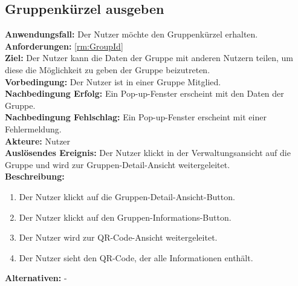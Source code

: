 \documentclass[parskip=full]{scrartcl}
\begin{document}
\subsection{Gruppenkürzel ausgeben}
\textbf{Anwendungsfall:} Der Nutzer möchte den Gruppenkürzel erhalten.\\
\textbf{Anforderungen:} \ref{rm:GroupId}\\
\textbf{Ziel:} Der Nutzer kann die Daten der Gruppe mit anderen Nutzern teilen, um diese die Möglichkeit zu geben der Gruppe beizutreten.\\
\textbf{Vorbedingung:} Der Nutzer ist in einer Gruppe Mitglied.\\
\textbf{Nachbedingung Erfolg:} Ein Pop-up-Fenster erscheint mit den Daten der Gruppe.\\
\textbf{Nachbedingung Fehlschlag:} Ein Pop-up-Fenster erscheint mit einer Fehlermeldung.\\
\textbf{Akteure:} Nutzer \\
\textbf{Auslösendes Ereignis:} Der Nutzer klickt in der Verwaltungsansicht auf die Gruppe und wird zur Gruppen-Detail-Ansicht weitergeleitet.\\
\textbf{Beschreibung:}
\begin{enumerate}
    \item Der Nutzer klickt auf die Gruppen-Detail-Ansicht-Button.
    \item Der Nutzer klickt auf den Gruppen-Informations-Button.
    \item Der Nutzer wird zur QR-Code-Ansicht weitergeleitet.
    \item Der Nutzer sieht den QR-Code, der alle Informationen enthält.
\end{enumerate}
\textbf{Alternativen:} -
\newpage
\end{document}
